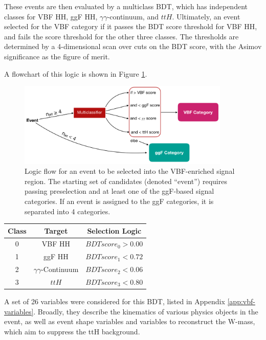 These events are then evaluated by a multiclass BDT, which has independent classes for VBF HH, ggF HH, $\gamma \gamma$-continuum, and $ttH$. Ultimately, an event selected for the VBF category if it passes the BDT score threshold for VBF HH, and fails the score threshold for the other three classes. The thresholds are determined by a 4-dimensional scan over cuts on the BDT score, with the Asimov significance as the figure of merit.

A flowchart of this logic is shown in Figure \ref{fig:vbf-logic}.

\begin{figure}[htbp]
    \centering
	\includegraphics[width=0.9\textwidth]{chapters/chapter6_vbf/images/vbf_logic.png}
    \caption{Logic flow for an event to be selected into the VBF-enriched signal region. The starting set of candidates (denoted ``event'') requires passing preselection and at least one of the ggF-based signal categories. If an event is assigned to the ggF categories, it is separated into 4 categories.}
    \label{fig:vbf-logic}
\end{figure}


\begin{center}
	\begin{tabular}{c|c|c}
	\hline
	Class & Target & Selection Logic  \\
	\hline
	0 & VBF HH & $BDTscore_{0} > 0.00 $ \\
	1 & ggF HH & $BDTscore_{1} < 0.72 $ \\
	2 & $\gamma\gamma$-Continuum &  $BDTscore_{2} < 0.06$ \\
	3 & $ttH$ &  $BDTscore_{3} < 0.80$ \\
	\hline
  \end{tabular}
\end{center}


A set of 26 variables were considered for this BDT, listed in Appendix \ref{app:vbf-variables}. Broadly, they describe the kinematics of various physics objects in the event, as well as event shape variables \cite{STDM-2011-33} and variables to reconstruct the W-mass, which aim to suppress the ttH background.

